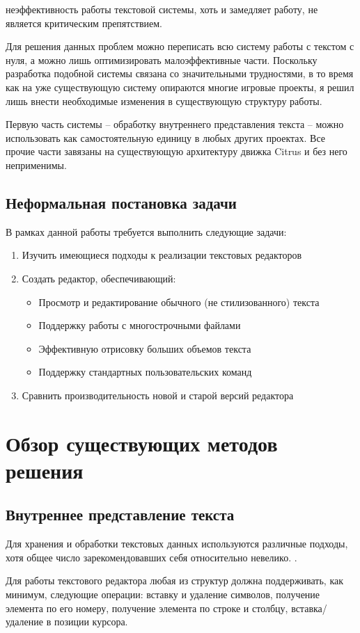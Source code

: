 \documentclass{fefu}
\begin{document}
				неэффективность работы текстовой системы, хоть и замедляет работу, не является
				критическим препятствием.
				\par Для решения данных проблем можно переписать всю систему работы с текстом с
				нуля, а можно лишь оптимизировать малоэффективные части. Поскольку разработка 
				подобной системы связана со значительными трудностями, в то время как на уже
				существующую систему опираются многие игровые проекты, я решил лишь внести 
				необходимые изменения в существующую структуру работы.
				\par Первую часть системы -- обработку внутреннего представления текста -- 
				можно использовать как самостоятельную единицу в любых других проектах. Все 
				прочие части завязаны на существующую архитектуру движка Citrus и без него 
				неприменимы.
		\subsection{Неформальная постановка задачи}
			В рамках данной работы требуется выполнить следующие задачи:
			\begin{enumerate}
				\item Изучить имеющиеся подходы к реализации текстовых редакторов
				\item Создать редактор, обеспечивающий:
				\begin{itemize}
					\item Просмотр и редактирование обычного (не стилизованного) текста
					\item Поддержку работы с многострочными файлами
					\item Эффективную отрисовку больших объемов текста
					\item Поддержку стандартных пользовательских команд
				\end{itemize}
				\item Сравнить производительность новой и старой версий редактора
			\end{enumerate}
	\section{Обзор существующих методов решения}
		\subsection{Внутреннее представление текста}
			\par Для хранения и обработки текстовых данных используются различные подходы,
				хотя общее число зарекомендовавших себя относительно невелико.
				\cite{TextEditorDataStructures}.
			\par Для работы текстового редактора любая из структур должна поддерживать, как 
			минимум, следующие операции: вставку и удаление символов, получение элемента по его
			номеру, получение элемента по строке и столбцу, вставка/удаление в позиции курсора.
\end{document}
